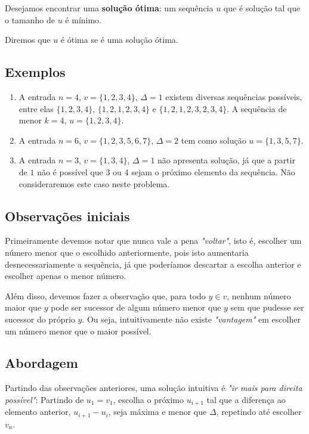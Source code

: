 Desejamos encontrar uma \textbf{solução ótima}: um sequência $u$ que é solução tal que o tamanho de $u$ é mínimo.

Diremos que $u$ é ótima se é uma solução ótima.

\subsection*{Exemplos}

\begin{enumerate}
    \item A entrada $n = 4$, $v = \{1, 2, 3, 4\}$, $\Delta = 1$ existem diversas sequências possíveis, entre elas $\{1, 2, 3, 4\}$, $\{1, 2, 1, 2, 3, 4\}$ e $\{1, 2, 1, 2, 3, 2, 3, 4\}$. A sequência de menor $k = 4$, $u = \{1, 2, 3, 4\}$.
    \item A entrada $n = 6$, $v = \{1, 2, 3, 5, 6, 7\}$, $\Delta = 2$ tem como solução $u = \{1, 3, 5, 7\}$.
    \item A entrada $n = 3$, $v = \{1, 3, 4\}$, $\Delta = 1$ não apresenta solução, já que a partir de $1$ não é possível que $3$ ou $4$ sejam o próximo elemento da sequência. Não consideraremos este caso neste problema.
\end{enumerate}

\subsection*{Observações iniciais}

Primeiramente devemos notar que nunca vale a pena \textit{"voltar"}, isto é, escolher um número menor que o escolhido anteriormente, pois isto aumentaria desnecessariamente a sequência, já que poderíamos descartar a escolha anterior e escolher apenas o menor número.

Além disso, devemos fazer a observação que, para todo $y \in v$, nenhum número maior que $y$ pode ser sucessor de algum número menor que $y$ sem que pudesse ser sucessor do próprio $y$. Ou seja, intuitivamente não existe \textit{"vantagem"} em escolher um número menor que o maior possível.

\subsection*{Abordagem}
\label{salto:abor}

Partindo das observações anteriores, uma solução intuitiva é \textit{"ir mais para direita possível"}: Partindo de $u_1 = v_1$, escolha o próximo $u_{i + 1}$ tal que a diferença ao elemento anterior, $u_{i + 1} - u_i$, seja máxima e menor que $\Delta$, repetindo até escolher $v_n$.

